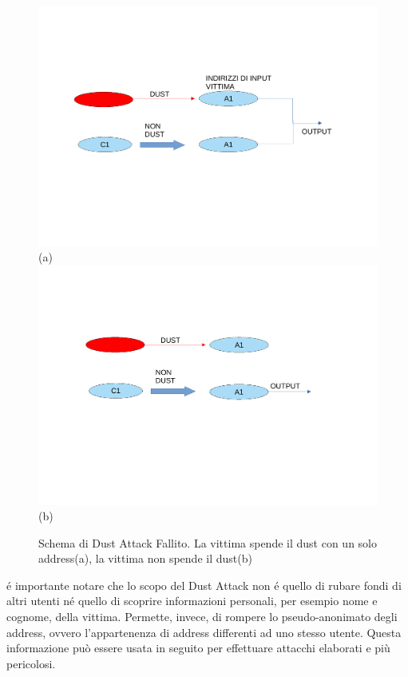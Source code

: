 \begin{figure}[h!]
    \centering
    \includegraphics[scale=0.5, trim = 1cm 6cm 0cm 3cm, clip]{Images/fallito2.pdf}
    (a)
    \includegraphics[scale=0.5, trim = 1cm 7cm 0cm 2cm, clip]{Images/fallito1.pdf}
    (b)
    \caption{Schema di Dust Attack Fallito. La vittima spende il dust con un solo address(a), la vittima non spende il dust(b)}
    \label{fig:fallito}
\end{figure}
\FloatBarrier

é importante notare che lo scopo del Dust Attack non é quello di rubare fondi di altri utenti né quello di scoprire informazioni personali, per esempio nome e cognome, della vittima. Permette, invece, di rompere lo pseudo-anonimato degli address, ovvero l'appartenenza di address differenti ad uno stesso utente. Questa informazione può essere usata in seguito per effettuare attacchi elaborati e più pericolosi.

